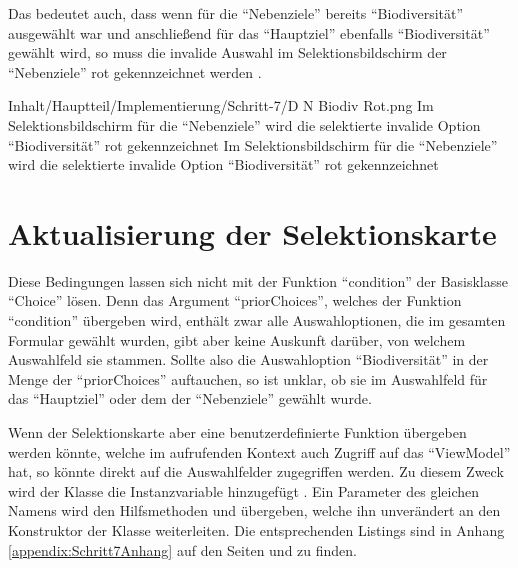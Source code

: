 \clearpage
Das bedeutet auch,
dass wenn für die \enquote{Nebenziele} bereits \enquote{Biodiversität} ausgewählt war
und anschließend für das \enquote{Hauptziel} ebenfalls \enquote{Biodiversität} gewählt wird,
so muss die invalide Auswahl im Selektionsbildschirm der \enquote{Nebenziele} rot gekennzeichnet werden \Abb{\ref{fig:Schritt4EingabemaskeDNBiodivRot}}. 

\begin{alexfigure}{Inhalt/Hauptteil/Implementierung/Schritt-7/D N Biodiv Rot.png}
  {Im Selektionsbildschirm für die \enquote{Nebenziele} wird die selektierte invalide Option \enquote{Biodiversität} rot gekennzeichnet}
  {Im Selektionsbildschirm für die \enquote{Nebenziele} wird die selektierte invalide Option \enquote{Biodiversität} rot gekennzeichnet}

  \label{fig:Schritt4EingabemaskeDNBiodivRot}

\end{alexfigure}


\section{Aktualisierung der Selektionskarte}

Diese Bedingungen lassen sich nicht mit der Funktion \enquote{condition} der Basisklasse \enquote{Choice} lösen.
Denn das Argument \enquote{priorChoices},
welches der Funktion \enquote{condition} übergeben wird,
enthält zwar alle Auswahloptionen,
die im gesamten Formular gewählt wurden,
gibt aber keine Auskunft darüber,
von welchem Auswahlfeld sie stammen. 
Sollte also die Auswahloption \enquote{Biodiversität} in der Menge der \enquote{priorChoices} auftauchen,
so ist unklar,
ob sie im Auswahlfeld für das \enquote{Hauptziel} oder dem der \enquote{Nebenziele} gewählt wurde.

Wenn der Selektionskarte aber eine benutzerdefinierte Funktion übergeben werden könnte,
welche im aufrufenden Kontext auch Zugriff auf das \enquote{ViewModel} hat,
so könnte direkt auf die Auswahlfelder zugegriffen werden.
Zu diesem Zweck wird der Klasse  die Instanzvariable  hinzugefügt .
Ein Parameter des gleichen Namens wird den Hilfsmethoden  und  übergeben, welche ihn unverändert an den Konstruktor der Klasse  weiterleiten.
Die entsprechenden Listings sind in Anhang \ref{appendix:Schritt7Anhang} auf den Seiten \pageref{lst:Schritt7AppendixbuildSelectionCard} und \pageref{lst:Schritt7buildMultiSelectionCard} zu finden.






